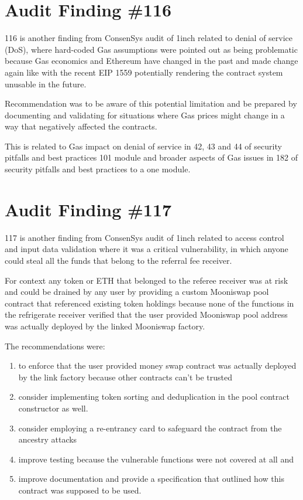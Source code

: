 \section{Audit Finding \#116}

116 is another finding from ConsenSys audit of 1inch related to denial of service (DoS), where hard-coded Gas assumptions were pointed out as being problematic because Gas economics and Ethereum have changed in the past and made change again like with the recent EIP 1559 potentially rendering the contract system unusable in the future.

Recommendation was to be aware of this potential limitation and be prepared by documenting and validating for situations where Gas prices might change in a way that negatively affected the contracts.

This is related to Gas impact on denial of service in 42, 43 and 44 of security pitfalls and best practices 101 module and broader aspects of Gas issues in 182 of security pitfalls and best practices to a one module.

\section{Audit Finding \#117}

117 is another finding from ConsenSys audit of 1inch related to access control and input data validation where it was a critical vulnerability, in which anyone could steal all the funds that belong to the referral fee receiver. 

For context any token or ETH that belonged to the referee receiver was at risk and could be drained by any user by providing a custom Mooniswap pool contract that referenced existing token holdings because none of the functions in the refrigerate receiver verified that the user provided Mooniswap pool address was actually deployed by the linked Mooniswap factory.

The recommendations were: 

\begin{enumerate}
\item to enforce that the user provided money swap contract was actually deployed by the link factory because other contracts can't be trusted 
\item consider implementing token sorting and deduplication in the pool contract constructor as well.
\item consider employing a re-entrancy card to safeguard the contract from the ancestry attacks
\item improve testing because the vulnerable functions were not covered at all and 
\item improve documentation and provide a specification that outlined how this contract was supposed to be used.
\end{enumerate}

